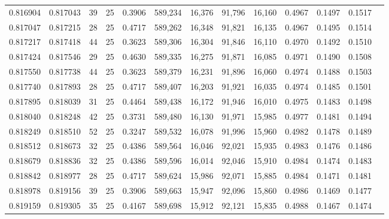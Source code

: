 \begin{tabular}{rrrrrrrrrrrrr}
0.816904 & 0.817043 &    39 &  25 &                                     0.3906 & 589,234 &  16,376 &  91,796 &  16,160 & 0.4967 & 0.1497 & 0.1517 \\
0.817047 & 0.817215 &    28 &  25 &                                     0.4717 & 589,262 &  16,348 &  91,821 &  16,135 & 0.4967 & 0.1495 & 0.1514 \\
0.817217 & 0.817418 &    44 &  25 &                                     0.3623 & 589,306 &  16,304 &  91,846 &  16,110 & 0.4970 & 0.1492 & 0.1510 \\
0.817424 & 0.817546 &    29 &  25 &                                     0.4630 & 589,335 &  16,275 &  91,871 &  16,085 & 0.4971 & 0.1490 & 0.1508 \\
0.817550 & 0.817738 &    44 &  25 &                                     0.3623 & 589,379 &  16,231 &  91,896 &  16,060 & 0.4974 & 0.1488 & 0.1503 \\
0.817740 & 0.817893 &    28 &  25 &                                     0.4717 & 589,407 &  16,203 &  91,921 &  16,035 & 0.4974 & 0.1485 & 0.1501 \\
0.817895 & 0.818039 &    31 &  25 &                                     0.4464 & 589,438 &  16,172 &  91,946 &  16,010 & 0.4975 & 0.1483 & 0.1498 \\
0.818040 & 0.818248 &    42 &  25 &                                     0.3731 & 589,480 &  16,130 &  91,971 &  15,985 & 0.4977 & 0.1481 & 0.1494 \\
0.818249 & 0.818510 &    52 &  25 &                                     0.3247 & 589,532 &  16,078 &  91,996 &  15,960 & 0.4982 & 0.1478 & 0.1489 \\
0.818512 & 0.818673 &    32 &  25 &                                     0.4386 & 589,564 &  16,046 &  92,021 &  15,935 & 0.4983 & 0.1476 & 0.1486 \\
0.818679 & 0.818836 &    32 &  25 &                                     0.4386 & 589,596 &  16,014 &  92,046 &  15,910 & 0.4984 & 0.1474 & 0.1483 \\
0.818842 & 0.818977 &    28 &  25 &                                     0.4717 & 589,624 &  15,986 &  92,071 &  15,885 & 0.4984 & 0.1471 & 0.1481 \\
0.818978 & 0.819156 &    39 &  25 &                                     0.3906 & 589,663 &  15,947 &  92,096 &  15,860 & 0.4986 & 0.1469 & 0.1477 \\
0.819159 & 0.819305 &    35 &  25 &                                     0.4167 & 589,698 &  15,912 &  92,121 &  15,835 & 0.4988 & 0.1467 & 0.1474 \\

\end{tabular}
